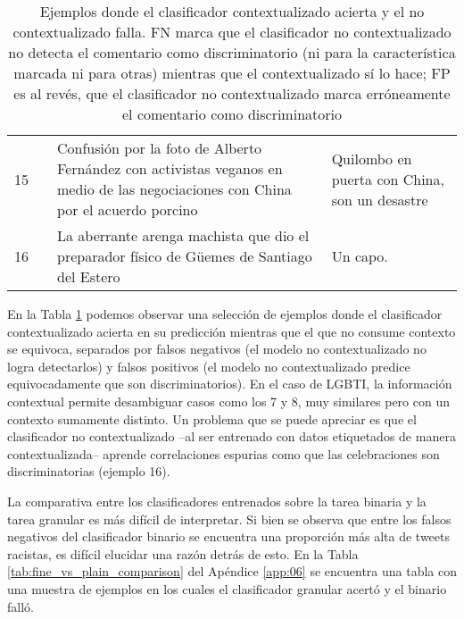\begin{table}[ht!]
\begin{tabular}{p{} p{} p{} p{}}
                   \hline
        15 &            & Confusión por la foto de Alberto Fernández con activistas veganos en medio de las negociaciones con China por el acuerdo porcino & Quilombo en puerta con China, son un desastre \\
        16 &            & La aberrante arenga machista que dio el preparador físico de Güemes de Santiago del Estero & Un capo. \\
        \hline
    \end{tabular}
    \caption{Ejemplos donde el clasificador contextualizado acierta y el no contextualizado falla. FN marca que el clasificador no contextualizado no detecta el comentario como discriminatorio (ni para la característica marcada ni para otras) mientras que el contextualizado sí lo hace; FP es al revés, que el clasificador no contextualizado marca erróneamente el comentario como discriminatorio  }
    \label{tab:context_vs_no_context_error}
\end{table}


En la Tabla \ref{tab:context_vs_no_context_error} podemos observar una selección de ejemplos donde el clasificador contextualizado acierta en su predicción mientras que el que no consume contexto se equivoca, separados por falsos negativos (el modelo no contextualizado no logra detectarlos) y falsos positivos (el modelo no contextualizado predice equivocadamente que son discriminatorios). En el caso de LGBTI, la información contextual permite desambiguar casos como los 7 y 8, muy similares pero con un contexto sumamente distinto. Un problema que se puede apreciar es que el clasificador no contextualizado --al ser entrenado con datos etiquetados de manera contextualizada-- aprende correlaciones espurias como que las celebraciones son discriminatorias (ejemplo 16).

La comparativa entre los clasificadores entrenados sobre la tarea binaria y la tarea granular es más difícil de interpretar. Si bien se observa que entre los falsos negativos del clasificador binario se encuentra una proporción más alta de tweets racistas, es difícil elucidar una razón detrás de esto. En la Tabla \ref{tab:fine_vs_plain_comparison} del Apéndice \ref{app:06} se encuentra una tabla con una muestra de ejemplos en los cuales el clasificador granular acertó y el binario falló.
